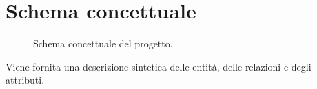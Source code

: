 \documentclass{article}
\begin{document}
\section{Schema concettuale}
\begin{figure}[H]
    \caption{Schema concettuale del progetto.}
\end{figure}
Viene fornita una descrizione sintetica delle entità, delle relazioni e degli attributi.
\end{document}
